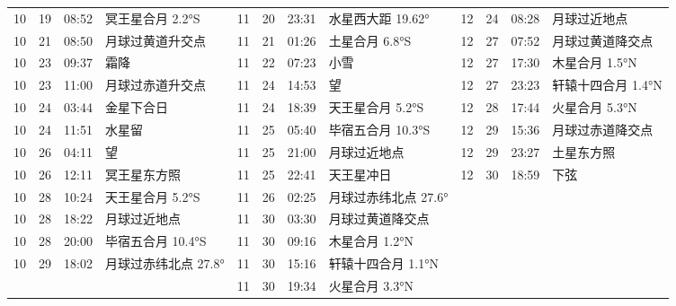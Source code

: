 \begin{tabular}{llll|llll|llll}
10 & 19 & 08:52 & 冥王星合月 2.2°S & 11 & 20 & 23:31 & 水星西大距 19.62° & 12 & 24 & 08:28 & 月球过近地点 \tabularnewline
10 & 21 & 08:50 & 月球过黄道升交点 & 11 & 21 & 01:26 & 土星合月 6.8°S & 12 & 27 & 07:52 & 月球过黄道降交点 \tabularnewline
10 & 23 & 09:37 & 霜降 & 11 & 22 & 07:23 & 小雪 & 12 & 27 & 17:30 & 木星合月 1.5°N \tabularnewline
10 & 23 & 11:00 & 月球过赤道升交点 & 11 & 24 & 14:53 & 望 & 12 & 27 & 23:23 & 轩辕十四合月 1.4°N \tabularnewline
10 & 24 & 03:44 & 金星下合日 & 11 & 24 & 18:39 & 天王星合月 5.2°S & 12 & 28 & 17:44 & 火星合月 5.3°N \tabularnewline
10 & 24 & 11:51 & 水星留 & 11 & 25 & 05:40 & 毕宿五合月 10.3°S & 12 & 29 & 15:36 & 月球过赤道降交点 \tabularnewline
10 & 26 & 04:11 & 望 & 11 & 25 & 21:00 & 月球过近地点 & 12 & 29 & 23:27 & 土星东方照 \tabularnewline
10 & 26 & 12:11 & 冥王星东方照 & 11 & 25 & 22:41 & 天王星冲日 & 12 & 30 & 18:59 & 下弦 \tabularnewline
10 & 28 & 10:24 & 天王星合月 5.2°S & 11 & 26 & 02:25 & 月球过赤纬北点 27.6° &  &  &  &  \tabularnewline
10 & 28 & 18:22 & 月球过近地点 & 11 & 30 & 03:30 & 月球过黄道降交点 &  &  &  &  \tabularnewline
10 & 28 & 20:00 & 毕宿五合月 10.4°S & 11 & 30 & 09:16 & 木星合月 1.2°N &  &  &  &  \tabularnewline
10 & 29 & 18:02 & 月球过赤纬北点 27.8° & 11 & 30 & 15:16 & 轩辕十四合月 1.1°N &  &  &  &  \tabularnewline
 &  &  &  & 11 & 30 & 19:34 & 火星合月 3.3°N &  &  &  &  \tabularnewline
\hline \end{tabular}
